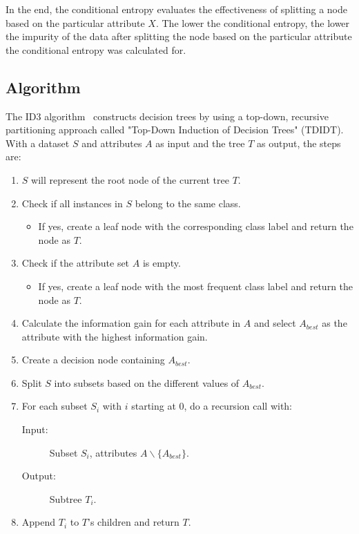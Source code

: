 In the end, the conditional entropy evaluates the effectiveness of splitting a node based on the particular attribute $X$. The lower the conditional entropy, the lower the impurity of the data after splitting the node based on the particular attribute the conditional entropy was calculated for.
\pagebreak

\subsection{Algorithm}
The ID3 algorithm~\cite{id3_algorithm_wiki} constructs decision trees by using a top-down, recursive partitioning approach called "Top-Down Induction of Decision Trees" (TDIDT). With a dataset $S$ and attributes $A$ as input and the tree $T$ as output, the steps are:

\begin{enumerate}
	\item $S$ will represent the root node of the current tree $T$.
	\item Check if all instances in $S$ belong to the same class.
    \begin{itemize}
        \item If yes, create a leaf node with the corresponding class label and return the node as $T$.
    \end{itemize}
    \item Check if the attribute set $A$ is empty.
    \begin{itemize}
        \item If yes, create a leaf node with the most frequent class label and return the node as $T$.
    \end{itemize}
    \item Calculate the information gain for each attribute in $A$ and select $A_{best}$ as the attribute with the highest information gain.
    \item Create a decision node containing $A_{best}$.
    \item Split $S$ into subsets based on the different values of $A_{best}$.
    \item For each subset $S_i$ with $i$ starting at 0, do a recursion call with:
    \begin{description}
    	\item[Input:] Subset $S_i$, attributes $A \backslash \{A_{best}\}$.
    	\item[Output:] Subtree $T_i$.
    \end{description}
    \item Append $T_i$ to $T$'s children and return $T$. 
\end{enumerate}

